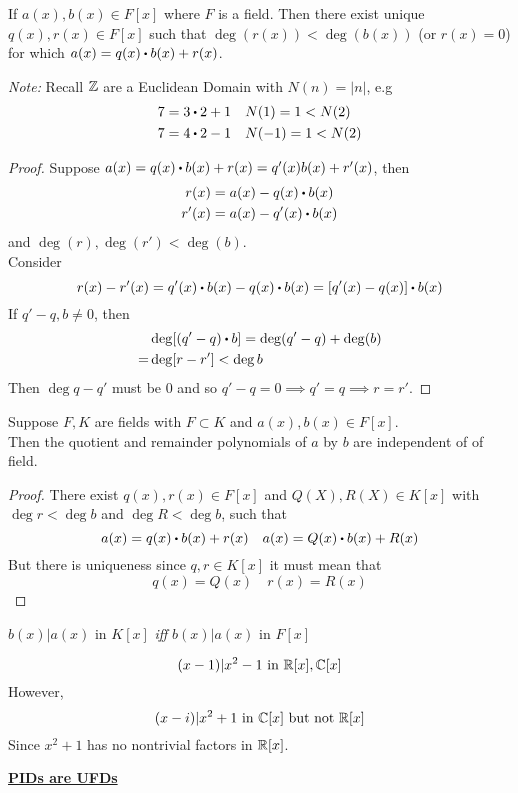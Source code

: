\documentclass[../Main.tex]{subfiles}
\begin{document}
\begin{thm}
	If $a(x),b(x)\in F[x]$ where $F$ is a field. Then there exist unique $q(x),r(x)\in F[x]$ such that $\deg (r(x)) < \deg (b(x))$ (or $r(x)=0$) for which $a(x)=q(x)\rdot b(x)+r(x)$.
\end{thm}
\textit{Note:} Recall $\mathbb{Z}$ are a Euclidean Domain with $N(n)=|n|$, e.g
\begin{align*}
7=3\rdot 2+1&\quad N(1)=1<N(2)\\
7=4\rdot 2-1&\quad N(-1)=1<N(2)
\end{align*}
\begin{proof}
	Suppose $a(x)=q(x)\rdot b(x)+r(x)=q'(x)b(x)+r'(x)$, then
	\begin{align*}
	r(x)&=a(x)-q(x)\rdot b(x)\\
	r'(x)&=a(x)-q'(x)\rdot b(x)
	\end{align*}
	and $\deg(r),\deg(r')<\deg(b)$.\\
	Consider
	\[r(x)-r'(x)=q'(x)\rdot b(x)-q(x)\rdot b(x) = [q'(x)-q(x)]\rdot b(x)\]
	If $q'-q,b\ne 0$, then 
	\begin{align*}
	&\deg[(q'-q)\rdot b]=\deg(q'-q)+\deg(b)\\
	=&\deg[r-r']<\deg b
	\end{align*}
	Then $\deg{q-q'}$ must be $0$ and so $q'-q=0\implies q'=q\implies r=r'$.
\end{proof}
\begin{crl}
	Suppose $F,K$ are fields with $F\subset K$ and $a(x),b(x)\in F[x]$. \\
	Then the quotient and remainder polynomials of $a$ by $b$ are independent of of field.
\end{crl}
\begin{proof}
	There exist $q(x),r(x)\in F[x]$ and $Q(X), R(X)\in K[x]$ with $\deg r< \deg b$ and $\deg R< \deg b$, such that
	\[a(x)=q(x)\rdot b(x)+r(x)\quad a(x)=Q(x)\rdot b(x)+R(x)\]
	But there is uniqueness since $q,r\in K[x]$ it must mean that
	\[q(x)=Q(x)\quad r(x)=R(x)\]
\end{proof}
\begin{crl}
	$b(x)|a(x)$ in $K[x]$ \textit{iff} $b(x)|a(x)$ in $F[x]$
\end{crl}
\begin{example}
	\[(x-1)|x^2-1 \text{ in } \mathbb{R}[x],\mathbb{C}[x]\]
	However,
	\[(x-i)| x^2+1 \text{ in } \mathbb{C}[x] \text{ but not } \mathbb{R}[x]\]
	Since $x^2+1$ has no nontrivial factors in $\mathbb{R}[x]$.
\end{example}
\newpage
\underline{\textbf{\Large PIDs are UFDs}}
\end{document}
